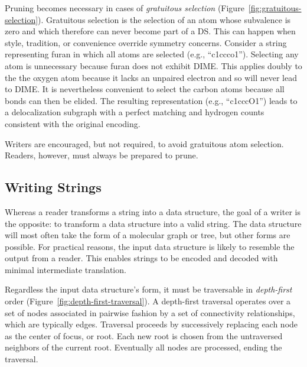 \documentclass{article}
\begin{document}
Pruning becomes necessary in cases of \textit{gratuitous selection} (Figure~\ref{fig:gratuitous-selection}). Gratuitous selection is the selection of an atom whose subvalence is zero and which therefore can never become part of a DS. This can happen when style, tradition, or convenience override symmetry concerns. Consider a string representing furan in which all atoms are selected (e.g., \enquote{c1ccco1}). Selecting any atom is unnecessary because furan does not exhibit DIME. This applies doubly to the the oxygen atom because it lacks an unpaired electron and so will never lead to DIME. It is nevertheless convenient to select the carbon atoms because all bonds can then be elided. The resulting representation (e.g., \enquote{c1cccO1}) leads to a delocalization subgraph with a perfect matching and hydrogen counts consistent with the original encoding.

Writers are encouraged, but not required, to avoid gratuitous atom selection. Readers, however, must always be prepared to prune.

\subsection*{Writing Strings}

Whereas a reader transforms a string into a data structure, the goal of a writer is the opposite: to transform a data structure into a valid string. The data structure will most often take the form of a molecular graph or tree, but other forms are possible. For practical reasons, the input data structure is likely to resemble the output from a reader. This enables strings to be encoded and decoded with minimal intermediate translation.

Regardless the input data structure's form, it must be traversable in \textit{depth-first} order (Figure~\ref{fig:depth-first-traversal}). A depth-first traversal operates over a set of nodes associated in pairwise fashion by a set of connectivity relationships, which are typically edges. Traversal proceeds by successively replacing each node as the center of focus, or root. Each new root is chosen from the untraversed neighbors of the current root. Eventually all nodes are processed, ending the traversal.
\end{document}
